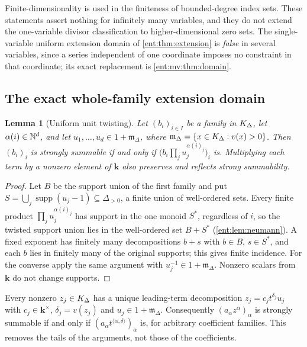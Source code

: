 \documentclass[11pt]{article}
\theoremstyle{plain}
\newtheorem{lemma}[lemma]{Lemma}
\theoremstyle{plain}
\theoremstyle{plain}
\theoremstyle{definition}
\theoremstyle{definition}
\theoremstyle{definition}
\theoremstyle{definition}
\theoremstyle{remark}
\DeclareMathOperator{\supp}{supp}\DeclareMathOperator{\lc}{lc}
\newcommand{\kk}{\mathbf k}\newcommand{\PP}{\mathbb P}
\newcommand{\inner}[2]{\langle#1,#2\rangle}
\begin{document}
Finite-dimensionality is used in the finiteness of bounded-degree index sets.
These statements assert nothing for infinitely many variables, and they do
not extend the one-variable divisor classification to higher-dimensional zero
sets. The single-variable uniform extension domain of \cref{ent:thm:extension}
is \emph{false} in several variables, since a series independent of one
coordinate imposes no constraint in that coordinate; its exact replacement is
\cref{ent:mv:thm:domain}.

\subsection{The exact whole-family extension domain}
\label{ent:mv:subsec:domain}

\begin{lemma}[Uniform unit twisting]\label{ent:mv:lem:twist}
Let $(b_i)_{i\in I}$ be a family in $K_\Delta$, let $\alpha(i)\in\mathbb N^d$, and let
$u_1,\ldots,u_d\in1+\mathfrak m_\Delta$, where
$\mathfrak m_\Delta=\{x\in K_\Delta:v(x)>0\}$. Then $(b_i)_i$ is strongly summable
if and only if $\bigl(b_i\prod_ju_j^{\alpha(i)_j}\bigr)_i$ is. Multiplying
each term by a nonzero element of $\kk$ also preserves and reflects strong
summability.
\end{lemma}
\begin{proof}
Let $B$ be the support union of the first family and put
$S=\bigcup_j\supp(u_j-1)\subseteq\Delta_{>0}$, a finite union of
well-ordered sets. Every finite product $\prod_ju_j^{\alpha(i)_j}$ has
support in the one monoid $S^*$, regardless of $i$, so the twisted support
union lies in the well-ordered set $B+S^*$ (\cref{ent:lem:neumann}). A fixed
exponent has finitely many decompositions $b+s$ with $b\in B$, $s\in S^*$,
and each $b$ lies in finitely many of the original supports; this gives
finite incidence. For the converse apply the same argument with
$u_j^{-1}\in1+\mathfrak m_\Delta$. Nonzero scalars from $\kk$ do not change
supports.
\end{proof}

Every nonzero $z_j\in K_\Delta$ has a unique leading-term decomposition
$z_j=c_jt^{\delta_j}u_j$ with $c_j\in\kk^\times$, $\delta_j=v(z_j)$ and
$u_j\in1+\mathfrak m_\Delta$. Consequently $(a_\alpha z^\alpha)_\alpha$ is
strongly summable if and only if $(a_\alpha t^{\inner\alpha\delta})_\alpha$
is, for arbitrary coefficient families. This removes the tails of the
arguments, not those of the coefficients.
\end{document}
